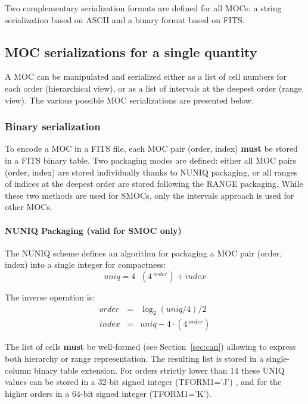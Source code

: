 \documentclass[11pt,a4paper]{ivoa}
\begin{document}
Two complementary serialization formats are defined for all MOCs:
a string serialization based on ASCII and a binary format based on FITS.

\subsection{MOC serializations for a single quantity}

A MOC can be manipulated and serialized either as a list of cell
numbers for each order (hierarchical view), or as a list of intervals
at the deepest order (range view).
The various possible MOC serializations are presented below.

\subsubsection{Binary serialization}
To encode a MOC in a FITS file, each MOC pair (order, index) {\bf
  must} be stored in a FITS binary table. Two packaging modes are
defined: either all MOC pairs (order, index) are stored individually
thanks to NUNIQ packaging, or all ranges of indices at the deepest
order are stored following the RANGE packaging.
While these two methods are used for
SMOCs, only the intervals approach is used for other MOCs.

\paragraph{NUNIQ Packaging (valid for SMOC only)}
The NUNIQ scheme defines an algorithm for packaging a MOC pair (order,
index) into a single integer for compactness:
\begin{equation}
    \textit{uniq} = 4 \cdot (4\,^\textit{order}) + \textit{index}
\end{equation}

\par\noindent
The inverse operation is:
\begin{eqnarray}
    \textit{order} & = &\log_2(\textit{uniq}/4)/2\\
    \textit{index} & = &\textit{uniq} - 4 \cdot (4\,^\textit{order})
\end{eqnarray}

\par\noindent The list of cells {\bf must} be well-formed
(see Section~\ref{sec:can}) allowing
to express both hierarchy or range representation. The resulting
list is stored in a single-column binary table extension.
For orders strictly lower than 14 these UNIQ values can be stored
in a 32-bit signed integer (TFORM1='J') , and for the higher
orders in a 64-bit signed integer (TFORM1='K').
\end{document}
